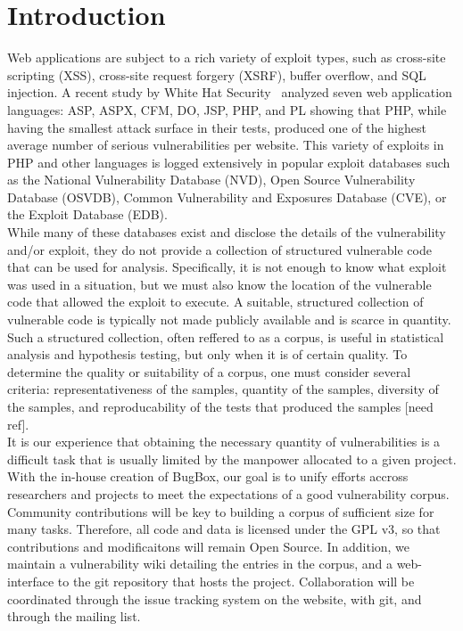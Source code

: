 \documentclass[letterpaper,twocolumn,10pt]{article}
\begin{document}
\section{Introduction}
Web applications are subject to a rich variety of exploit types, such as cross-site scripting (XSS), cross-site request forgery (XSRF), buffer overflow, and SQL injection.  A recent study by White Hat Security~\cite{WhiteHat:2010:Online} analyzed seven web application languages: ASP, ASPX, CFM, DO, JSP, PHP, and PL showing that PHP, while having the smallest attack surface in their tests, produced one of the highest average number of serious vulnerabilities per website.  This variety of exploits in PHP and other languages is logged extensively in popular exploit databases such as the National Vulnerability Database (NVD), Open Source Vulnerability Database (OSVDB), Common Vulnerability and Exposures Database (CVE), or the Exploit Database (EDB).\\

While many of these databases exist and disclose the details of the vulnerability and/or exploit, they do not provide a collection of structured vulnerable code that can be used for analysis.  Specifically, it is not enough to know what exploit was used in a situation, but we must also know the location of the vulnerable code that allowed the exploit to execute.  A suitable, structured collection of vulnerable code is typically not made publicly available and is scarce in quantity.  Such a structured collection, often reffered to as a corpus, is useful in statistical analysis and hypothesis testing, but only when it is of certain quality.  To determine the quality or suitability of a corpus, one must consider several criteria: representativeness of the samples, quantity of the samples, diversity of the samples, and reproducability of the tests that produced the samples [need ref].\\
It is our experience that obtaining the necessary quantity of vulnerabilities is a difficult task that is usually limited by the manpower allocated to a given project. With the in-house creation of BugBox, our goal is to unify efforts accross researchers and projects to meet the expectations of a good vulnerability corpus. Community contributions will be key to building a corpus of sufficient size for many tasks. Therefore, all code and data is licensed under the GPL v3, so that contributions and modificaitons will remain Open Source. In addition, we maintain a vulnerability wiki detailing the entries in the corpus, and a web-interface to the git repository that hosts the project. Collaboration will be coordinated through the issue tracking system on the website, with git, and through the mailing list. \\
\end{document}
